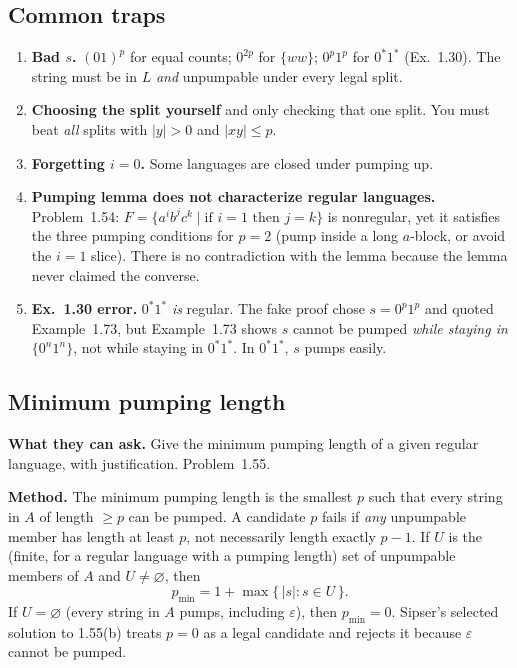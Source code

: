 \documentclass[11pt,a4paper]{article}
\newcommand{\eps}{\varepsilon}
\begin{document}
\subsection{Common traps}

\begin{enumerate}
  \item \textbf{Bad $s$.} $(01)^p$ for equal counts; $0^{2p}$ for
        $\{ww\}$; $0^p1^p$ for $0^*1^*$ (Ex.~1.30). The string must
        be in $L$ \emph{and} unpumpable under every legal split.
  \item \textbf{Choosing the split yourself} and only checking that
        one split. You must beat \emph{all} splits with $|y|>0$ and
        $|xy|\le p$.
  \item \textbf{Forgetting $i=0$.} Some languages are closed under
        pumping up.
  \item \textbf{Pumping lemma does not characterize regular languages.}
        Problem~1.54: $F=\{a^ib^jc^k\mid\text{if }i=1\text{ then }j=k\}$
        is nonregular, yet it satisfies the three pumping conditions
        for $p=2$ (pump inside a long $a$-block, or avoid the $i=1$
        slice). There is no contradiction with the lemma because the
        lemma never claimed the converse.
  \item \textbf{Ex.~1.30 error.} $0^*1^*$ \emph{is} regular. The fake
        proof chose $s=0^p1^p$ and quoted Example~1.73, but
        Example~1.73 shows $s$ cannot be pumped \emph{while staying
        in $\{0^n1^n\}$}, not while staying in $0^*1^*$. In $0^*1^*$,
        $s$ pumps easily.
\end{enumerate}

\subsection{Minimum pumping length}
\label{type:min-pump}

\textbf{What they can ask.}
Give the minimum pumping length of a given regular language, with
justification. Problem~1.55.

\textbf{Method.}
The minimum pumping length is the smallest $p$ such that every
string in $A$ of length $\ge p$ can be pumped. A candidate $p$
fails if \emph{any} unpumpable member has length at least $p$, not
necessarily length exactly $p-1$. If $U$ is the (finite, for a
regular language with a pumping length) set of unpumpable members
of $A$ and $U\neq\varnothing$, then
\[
  p_{\min}=1+\max\{\,|s|:s\in U\,\}.
\]
If $U=\varnothing$ (every string in $A$ pumps, including $\eps$),
then $p_{\min}=0$. Sipser's selected solution to 1.55(b) treats
$p=0$ as a legal candidate and rejects it because $\eps$ cannot be
pumped.
\end{document}
